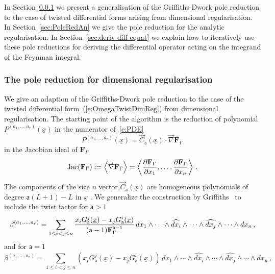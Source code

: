 \documentclass[a4paper,12pt]{article}
\numberwithin{equation}{section}
\numberwithin{figure}{section}
\begin{document}
  
  In Section~\ref{sec:PoleRed} we present a generalisation of the Griffiths-Dwork
  pole reduction to the case of twisted differential forms arising
  from dimensional regularisation. In Section~\ref{sec:PoleRedAn} we
  give the pole reduction for the analytic regularisation.
 In Section~\ref{sec:deriv-diff-equat} we explain how to iteratively use these pole reductions for
  deriving the differential operator acting on the integrand of the
  Feynman integral.

  \subsubsection{The pole reduction for dimensional
    regularisation}\label{sec:PoleRed}
We give an adaption of the Griffiths-Dwork pole reduction to the case
of the twisted differential form~(\ref{e:OmegaTwistDimReg}) from
dimensional regularisation.
The starting point of the algorithm is the reduction of polynomial
$P^{(a_1,\dots,a_r)}(\underline x)$  in the numerator
of~\eqref{e:PDE}
\begin{equation}\label{e:RedF}
	P^{(a_1,\dots,a_r)}(\underline x) = \vec C_{\mathsf{a}}(\underline x)\cdot
	\vec\nabla   \textbf{F}_\Gamma \, 
\end{equation}
in the Jacobian ideal of $\textbf{F}_\Gamma$ 
 \begin{equation}
	\textrm{Jac}(   \textbf{F}_\Gamma) :=\left\langle\vec\nabla  \textbf{F}_\Gamma \right\rangle =\left\langle{\partial
		\textbf{F}_\Gamma\over\partial x_1},\dots,  {\partial
		\textbf{F}_\Gamma\over\partial x_n}\right\rangle\,.
\end{equation}
%
The components of the size $n$ vector $ \vec C_{\mathsf{a}}(\underline x)$ are homogeneous polynomials of degree
$\mathsf{a}(L+1)-L$ in  $\underline x$ . 
%
   We generalize the construction by
   Griffiths~\cite{Griffith1,Griffith2} to include the twist factor
   for $\mathsf{a}>1$ 
   \begin{equation}\label{e:betadef}
  \beta^{(a_1,\dots,a_r)}=  \sum_{1\leq i<j\leq n} {x_i
    G_{\mathsf{a}}^j  (\underline x)-x_j
   G_{\mathsf{a}}^i(\underline x)\over
    (\mathsf{a}-1)\textbf{F}_\Gamma^{\mathsf{a}-1}}\, 
 dx_1\wedge \cdots \wedge \widehat{dx_i}\wedge \cdots \wedge\widehat{dx_j}\wedge
  \cdots \wedge dx_n \, ,
\end{equation}
and for $\mathsf{a}=1$
  \begin{equation}\label{e:betadefa1}
  \beta^{(a_1,\dots,a_r)}=  \sum_{1\leq i<j\leq n} \left(x_i
    G_{\mathsf{a}}^j  (\underline x)-x_j
   G_{\mathsf{a}}^i(\underline x)\right)\, 
 dx_1\wedge \cdots \wedge \widehat{dx_i}\wedge \cdots \wedge\widehat{dx_j}\wedge
  \cdots \wedge dx_n \, ,
\end{equation}
\end{document}
